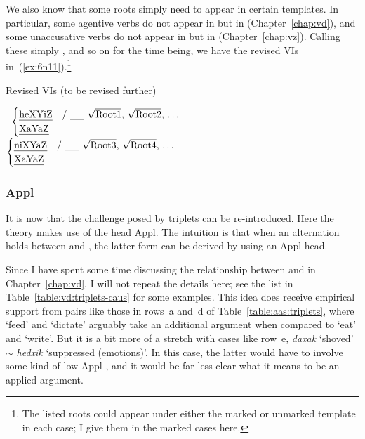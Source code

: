 \begin{exe}
\begin{xlist}
\begin{exe}
\begin{exe}
\begin{xlist}
\begin{exe}
\begin{exe}
\begin{exe}
\begin{exe}
\begin{exe}
\begin{xlist}
\begin{exe}
\begin{exe}
\begin{xlist}
We also know that some roots simply need to appear in certain templates. In particular, some agentive verbs do not appear in {\thif} but in {\tkal} (Chapter~\ref{chap:vd}), and some unaccusative verbs do not appear in {\tnif} but in {\tkal} (Chapter~\ref{chap:vz}). Calling these simply ,  and so on for the time being, we have the revised VIs in~(\ref{ex:6n11}).\footnote{The listed roots could appear under either the marked or unmarked template in each case; I give them in the marked cases here.}

 \begin{exe}
 \ex  \label{ex:6n11}Revised VIs (to be revised further) 
 \begin{xlist} 
 	\ex  {\vds} \lra~$\begin{cases} 
		\text{\thif} & \text{/ \trace~\root{Root1}, \root{Root2}, \dots}\\
		\text{\tkal} & \\
		\end{cases}$
 	\ex  {\vzs} \lra~$\begin{cases} 
		\text{\tnif} & \text{/ \trace~\root{Root3}, \root{Root4}, \dots}\\
		\text{\tkal} & \\
		\end{cases}$
 \z
\z 


		\subsubsection{Appl}
It is now that the challenge posed by triplets can be re-introduced. Here the theory makes use of the  head Appl. The intuition is that when an alternation holds between {\tkal} and {\thif}, the latter form can be derived by using an Appl head.

Since I have spent some time discussing the relationship between {\tkal} and {\thif} in Chapter~\ref{chap:vd}, I will not repeat the details here; see the list in Table~\ref{table:vd:triplets-caus} for some examples. This idea does receive empirical support from pairs like those in rows~a and~d of Table~\ref{table:aas:triplets}, where `feed' and `dictate' arguably take an additional argument when compared to `eat' and `write'. But it is a bit more of a stretch with cases like row~e, \emph{daxak} `shoved' $\sim$ \emph{hedxik} `suppressed (emotions)'. In this case, the latter would have to involve some kind of low Appl-, and it would be far less clear what it means to be an applied argument.


\end{xlist}
\end{exe}
\end{xlist}
\end{exe}
\end{exe}
\end{xlist}
\end{exe}
\end{exe}
\end{exe}
\end{exe}
\end{exe}
\end{xlist}
\end{exe}
\end{exe}
\end{xlist}
\end{exe}
